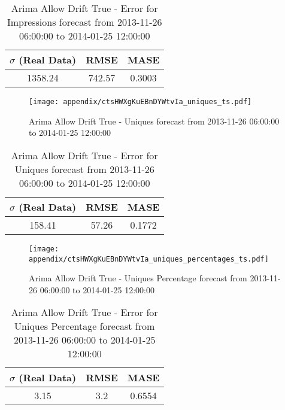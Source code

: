 \begin{table}[H]
\centering
\footnotesize
\begin{tabular}{ccc}
$\sigma$ (Real Data) & RMSE & MASE   \\ \hline
1358.24 & 742.57 & 0.3003 \\
\end{tabular}

\vspace{0.5cm}

\caption[]{
Arima Allow Drift True - Error for Impressions forecast from 2013-11-26 06:00:00 to 2014-01-25 12:00:00}
\end{table}

\begin{figure}[H] \begin{center} \leavevmode
\texttt{[image: appendix/ctsHWXgKuEBnDYWtvIa\_uniques\_ts.pdf]} \caption[]{
Arima Allow Drift True - Uniques forecast from 2013-11-26 06:00:00 to 2014-01-25 12:00:00} \label{fig:appendix/ctsHWXgKuEBnDYWtvIa_uniques_ts.pdf} \end{center}
\end{figure}

\begin{table}[H]
\centering
\footnotesize
\begin{tabular}{ccc}
$\sigma$ (Real Data) & RMSE & MASE   \\ \hline
158.41 & 57.26 & 0.1772 \\
\end{tabular}

\vspace{0.5cm}

\caption[]{
Arima Allow Drift True - Error for Uniques forecast from 2013-11-26 06:00:00 to 2014-01-25 12:00:00}
\end{table}

\begin{figure}[H] \begin{center} \leavevmode
\texttt{[image: appendix/ctsHWXgKuEBnDYWtvIa\_uniques\_percentages\_ts.pdf]} \caption[]{
Arima Allow Drift True - Uniques Percentage forecast from 2013-11-26 06:00:00 to 2014-01-25 12:00:00} \label{fig:appendix/ctsHWXgKuEBnDYWtvIa_uniques_percentages_ts.pdf} \end{center}
\end{figure}

\begin{table}[H]
\centering
\footnotesize
\begin{tabular}{ccc}
$\sigma$ (Real Data) & RMSE & MASE   \\ \hline
3.15 & 3.2 & 0.6554 \\
\end{tabular}

\vspace{0.5cm}

\caption[]{
Arima Allow Drift True - Error for Uniques Percentage forecast from 2013-11-26 06:00:00 to 2014-01-25 12:00:00}
\end{table}

